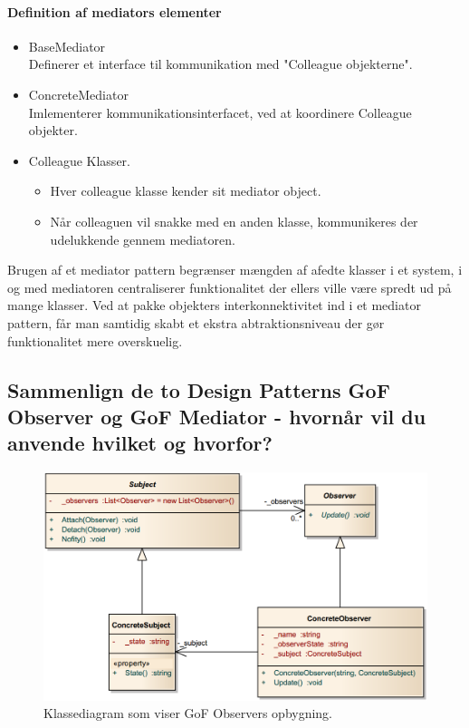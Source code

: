 \paragraph{Definition af mediators elementer}
\begin{itemize}
	\item BaseMediator\\
	Definerer et interface til kommunikation med "Colleague objekterne".
	\item ConcreteMediator\\
	Imlementerer kommunikationsinterfacet, ved at koordinere Colleague objekter.
	\item Colleague Klasser.
	\begin{itemize}
		\item Hver colleague klasse kender sit mediator object.
		\item Når colleaguen vil snakke med en anden klasse, kommunikeres der udelukkende gennem
		mediatoren.
	\end{itemize}
\end{itemize}

Brugen af et mediator pattern begrænser mængden af afedte klasser i et system, i og med
mediatoren centraliserer funktionalitet der ellers ville være spredt ud på mange klasser. Ved at
pakke objekters interkonnektivitet ind i et mediator pattern, får man samtidig skabt et ekstra
abtraktionsniveau der gør funktionalitet mere overskuelig.


\subsection{Sammenlign de to Design Patterns GoF Observer og GoF Mediator - hvornår vil du anvende hvilket og hvorfor?}

\begin{figure}[H]
	\centering
	\includegraphics[width=0.9\linewidth]{figs/observer_classdiagram}
	\caption[GoF Observer klassediagram]{Klassediagram som viser GoF Observers opbygning.}
	\label{fig:observer_classdiagram}
\end{figure}

